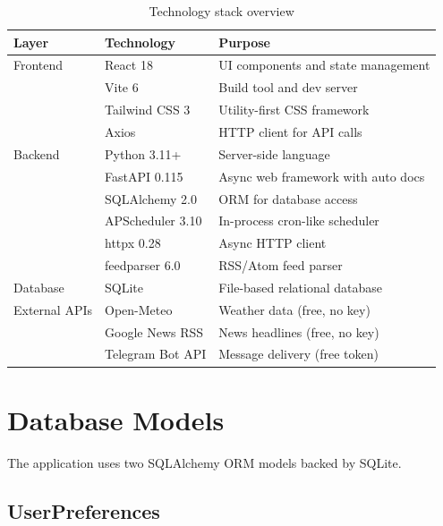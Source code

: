 \documentclass[12pt, a4paper]{article}
\begin{document}
\begin{table}[h!]
\centering
\begin{tabular}{@{}lll@{}}
\toprule
\textbf{Layer} & \textbf{Technology} & \textbf{Purpose} \\
\midrule
Frontend       & React 18            & UI components and state management \\
               & Vite 6              & Build tool and dev server \\
               & Tailwind CSS 3      & Utility-first CSS framework \\
               & Axios               & HTTP client for API calls \\
\midrule
Backend        & Python 3.11+        & Server-side language \\
               & FastAPI 0.115       & Async web framework with auto docs \\
               & SQLAlchemy 2.0      & ORM for database access \\
               & APScheduler 3.10    & In-process cron-like scheduler \\
               & httpx 0.28          & Async HTTP client \\
               & feedparser 6.0      & RSS/Atom feed parser \\
\midrule
Database       & SQLite              & File-based relational database \\
\midrule
External APIs  & Open-Meteo          & Weather data (free, no key) \\
               & Google News RSS     & News headlines (free, no key) \\
               & Telegram Bot API    & Message delivery (free token) \\
\bottomrule
\end{tabular}
\caption{Technology stack overview}
\end{table}

\section{Database Models}

The application uses two SQLAlchemy ORM models backed by SQLite.

\subsection{UserPreferences}
\end{document}
